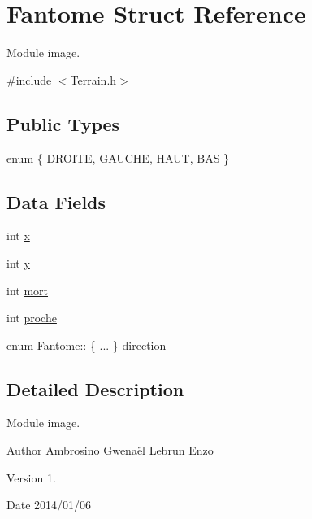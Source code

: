 \hypertarget{struct_fantome}{\section{Fantome Struct Reference}
\label{struct_fantome}
}


Module image.  




{\ttfamily \#include $<$Terrain.\-h$>$}

\subsection*{Public Types}
\begin{DoxyCompactItemize}
\item 
enum \{ \hyperlink{struct_fantome_a06fc87d81c62e9abb8790b6e5713c55ba79f680205087956546ae263797bd1343}{D\-R\-O\-I\-T\-E}, 
\hyperlink{struct_fantome_a06fc87d81c62e9abb8790b6e5713c55ba4ee960d97b04a1f22ed7ff81c7aa2e86}{G\-A\-U\-C\-H\-E}, 
\hyperlink{struct_fantome_a06fc87d81c62e9abb8790b6e5713c55ba5c97701a87d36c8f2c0de80c5865b8e2}{H\-A\-U\-T}, 
\hyperlink{struct_fantome_a06fc87d81c62e9abb8790b6e5713c55ba4b07baad9e862178efeac3e522475caa}{B\-A\-S}
 \}
\end{DoxyCompactItemize}
\subsection*{Data Fields}
\begin{DoxyCompactItemize}
\item 
int \hyperlink{struct_fantome_a6150e0515f7202e2fb518f7206ed97dc}{x}
\item 
int \hyperlink{struct_fantome_a0a2f84ed7838f07779ae24c5a9086d33}{y}
\item 
int \hyperlink{struct_fantome_a80e06e27760b1b0623a2aac7dc1bc191}{mort}
\item 
int \hyperlink{struct_fantome_ae8ffd4287a5e2d2b9c8a268be76a8b89}{proche}
\item 
enum Fantome\-:: \{ ... \}  \hyperlink{struct_fantome_a3b781c6f2ff99911d58614aedbf40c2a}{direction}
\end{DoxyCompactItemize}


\subsection{Detailed Description}
Module image. 

\begin{DoxyAuthor}{Author}
Ambrosino Gwenaël Lebrun Enzo 
\end{DoxyAuthor}
\begin{DoxyVersion}{Version}
1. 
\end{DoxyVersion}
\begin{DoxyDate}{Date}
2014/01/06 
\end{DoxyDate}



